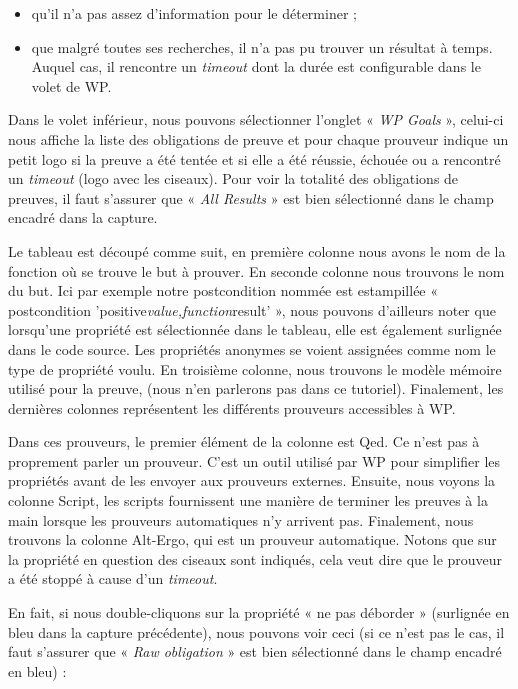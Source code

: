 \begin{itemize}
\item qu'il n'a pas assez d'information pour le déterminer ;
\item que malgré toutes ses recherches, il n'a pas pu trouver un résultat à
temps. Auquel cas, il rencontre un \textit{timeout} dont la durée est configurable
dans le volet de WP.
\end{itemize}


Dans le volet inférieur, nous pouvons sélectionner l'onglet « \textit{WP Goals} »,
celui-ci nous affiche la liste des obligations de preuve et pour chaque
prouveur indique un petit logo si la preuve a été tentée et si elle a été
réussie, échouée ou a rencontré un \textit{timeout} (logo avec les ciseaux).
Pour voir la totalité des obligations de preuves, il
faut s'assurer que « \textit{All Results} » est bien sélectionné dans le champ encadré
dans la capture.





Le tableau est découpé comme suit, en première colonne nous avons le nom de la
fonction où se trouve le but à prouver. En seconde colonne nous trouvons le nom
du but. Ici par exemple notre postcondition nommée est estampillée
« postcondition 'positive\textit{value,function}result' », nous pouvons d'ailleurs noter
que lorsqu'une propriété est sélectionnée dans le tableau, elle est également
surlignée dans le code source. Les propriétés anonymes se voient assignées
comme nom le type de propriété voulu. En troisième colonne, nous trouvons le
modèle mémoire utilisé pour la preuve, (nous n'en parlerons pas dans ce
tutoriel). Finalement, les dernières colonnes représentent les différents
prouveurs accessibles à WP.



Dans ces prouveurs, le premier élément de la colonne est Qed. Ce n'est pas
à proprement parler un prouveur. C'est un outil utilisé par WP pour simplifier
les propriétés avant de les envoyer aux prouveurs externes. Ensuite, nous
voyons la colonne Script, les scripts fournissent une manière de terminer
les preuves à la main lorsque les prouveurs automatiques n'y arrivent pas.
Finalement, nous trouvons la colonne Alt-Ergo, qui est un prouveur automatique.
Notons que sur la propriété en question des ciseaux sont indiqués, cela
veut dire que le prouveur a été stoppé à cause d'un \textit{timeout}.


En fait, si nous double-cliquons sur la
propriété « ne pas déborder » (surlignée en bleu dans la capture précédente),
nous pouvons voir ceci (si ce n'est pas le cas, il faut s'assurer que
« \textit{Raw obligation} » est bien sélectionné dans le champ encadré en bleu) :



